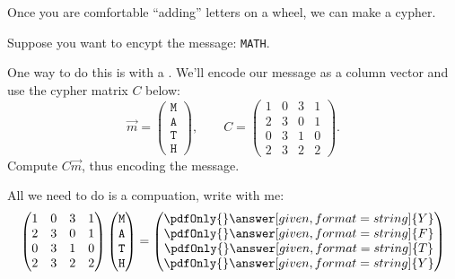 \documentclass{ximera}
\begin{document}
Once you are comfortable ``adding'' letters on a wheel, we can make a cypher.

\begin{example}[Cryptography]
  Suppose you want to encypt the message: \texttt{MATH}.


  One way to do this is with a . We'll encode
  our message as a column vector and use the cypher matrix $C$ below:
  \[
    \vec{m} =
    \begin{pmatrix}
      \texttt M\\
      \texttt A\\
      \texttt T\\
      \texttt H
    \end{pmatrix},
    \qquad
    C= \begin{pmatrix}
      1 & 0 & 3 & 1 \\
      2 & 3 & 0 & 1 \\
      0 & 3 & 1 & 0 \\
      2 & 3 & 2 & 2
    \end{pmatrix}.
  \]
 Compute $C\vec{m}$, thus encoding the message.
 \begin{explanation}
   All we need to do is a compuation, write with me:
   \[
   \begin{pmatrix}
 1 & 0 & 3 & 1 \\
 2 & 3 & 0 & 1 \\
 0 & 3 & 1 & 0 \\
 2 & 3 & 2 & 2
   \end{pmatrix}
   \begin{pmatrix}
    \texttt M\\
    \texttt A\\
    \texttt T\\
    \texttt H
   \end{pmatrix}
   =
     \begin{pmatrix}
    \pdfOnly{\tt}\answer[given,format=string]{Y}\\
    \pdfOnly{\tt}\answer[given,format=string]{F}\\
    \pdfOnly{\tt}\answer[given,format=string]{T}\\
    \pdfOnly{\tt}\answer[given,format=string]{Y}
   \end{pmatrix}
   \]
 \end{explanation}
\end{example}
\end{document}
